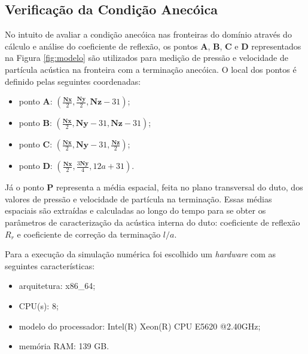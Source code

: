 \subsection{Verificação da Condição Anecóica}

No intuito de avaliar a condição anecóica nas fronteiras do domínio através do cálculo e análise do coeficiente de reflexão, os pontos $\textbf{A}$, $\textbf{B}$, $\textbf{C}$ e $\textbf{D}$ representados na Figura \ref{fig:modelo} são utilizados para medição de pressão e velocidade de partícula acústica na fronteira com a terminação anecóica. O local dos pontos é definido pelas seguintes coordenadas:

\begin{itemize}
  \item ponto $\textbf{A}$: $(\frac{\textbf{Nx}}{2}, \frac{\textbf{Ny}}{2}, \textbf{Nz} - 31)$;
  \item ponto $\textbf{B}$: $(\frac{\textbf{Nx}}{2}, \textbf{Ny} - 31, \textbf{Nz} - 31)$;
  \item ponto $\textbf{C}$: $(\frac{\textbf{Nx}}{2}, \textbf{Ny} - 31, \frac{\textbf{Nz}}{2})$;
   \item ponto $\textbf{D}$: $(\frac{\textbf{Nx}}{2}, \frac{3\textbf{Ny}}{4}, 12a + 31)$.
\end{itemize}
 
Já o ponto $\textbf{P}$ representa a média espacial, feita no plano transversal do duto, dos valores de pressão e velocidade de partícula na terminação. Essas médias espaciais são extraídas e calculadas ao longo do tempo para se obter os parâmetros de caracterização da acústica interna do duto: coeficiente de reflexão $R_{r}$ e coeficiente de correção da terminação $l/a$.

Para a execução da simulação numérica foi escolhido um \textit{hardware} com as seguintes características:

\begin{itemize}
  \item arquitetura: x86\_64;
  \item CPU(s): 8;
  \item modelo do processador: Intel(R) Xeon(R) CPU E5620 @2.40GHz;
  \item memória RAM: 139 GB.
\end{itemize}






